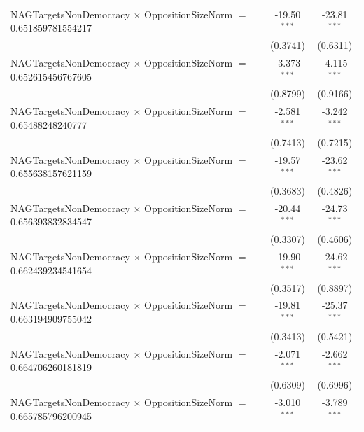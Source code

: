 \begin{tabular}{lcc}
   NAGTargetsNonDemocracy $\times$ OppositionSizeNorm $=$ 0.651859781554217     & -19.50$^{***}$       & -23.81$^{***}$\\   
                                                                                & (0.3741)             & (0.6311)\\   
   NAGTargetsNonDemocracy $\times$ OppositionSizeNorm $=$ 0.652615456767605     & -3.373$^{***}$       & -4.115$^{***}$\\   
                                                                                & (0.8799)             & (0.9166)\\   
   NAGTargetsNonDemocracy $\times$ OppositionSizeNorm $=$ 0.65488248240777      & -2.581$^{***}$       & -3.242$^{***}$\\   
                                                                                & (0.7413)             & (0.7215)\\   
   NAGTargetsNonDemocracy $\times$ OppositionSizeNorm $=$ 0.655638157621159     & -19.57$^{***}$       & -23.62$^{***}$\\   
                                                                                & (0.3683)             & (0.4826)\\   
   NAGTargetsNonDemocracy $\times$ OppositionSizeNorm $=$ 0.656393832834547     & -20.44$^{***}$       & -24.73$^{***}$\\   
                                                                                & (0.3307)             & (0.4606)\\   
   NAGTargetsNonDemocracy $\times$ OppositionSizeNorm $=$ 0.662439234541654     & -19.90$^{***}$       & -24.62$^{***}$\\   
                                                                                & (0.3517)             & (0.8897)\\   
   NAGTargetsNonDemocracy $\times$ OppositionSizeNorm $=$ 0.663194909755042     & -19.81$^{***}$       & -25.37$^{***}$\\   
                                                                                & (0.3413)             & (0.5421)\\   
   NAGTargetsNonDemocracy $\times$ OppositionSizeNorm $=$ 0.664706260181819     & -2.071$^{***}$       & -2.662$^{***}$\\   
                                                                                & (0.6309)             & (0.6996)\\   
   NAGTargetsNonDemocracy $\times$ OppositionSizeNorm $=$ 0.665785796200945     & -3.010$^{***}$       & -3.789$^{***}$\\   

\end{tabular}
